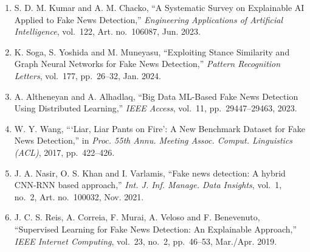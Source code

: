 \documentclass[12pt,a4paper,oneside]{report}
\begin{document}
\begin{enumerate}[label=\arabic*., leftmargin=*, itemsep=6pt]
  \item S. D. M. Kumar and A. M. Chacko,
        ``A Systematic Survey on Explainable AI Applied to Fake News Detection,''
        \textit{Engineering Applications of Artificial Intelligence},
        vol.~122, Art. no.~106087, Jun. 2023.

  \item K. Soga, S. Yoshida and M. Muneyasu,
        ``Exploiting Stance Similarity and Graph Neural Networks for Fake News
        Detection,'' \textit{Pattern Recognition Letters}, vol.~177,
        pp.~26--32, Jan. 2024.

  \item A. Altheneyan and A. Alhadlaq,
        ``Big Data ML-Based Fake News Detection Using Distributed Learning,''
        \textit{IEEE Access}, vol.~11, pp.~29447--29463, 2023.

  \item W. Y. Wang,
        ```Liar, Liar Pants on Fire': A New Benchmark Dataset for Fake News
        Detection,'' in \textit{Proc. 55th Annu. Meeting Assoc. Comput.
        Linguistics (ACL)}, 2017, pp.~422--426.

  \item J. A. Nasir, O. S. Khan and I. Varlamis,
        ``Fake news detection: A hybrid CNN-RNN based approach,''
        \textit{Int. J. Inf. Manage. Data Insights}, vol.~1, no.~2,
        Art. no.~100032, Nov. 2021.

  \item J. C. S. Reis, A. Correia, F. Murai, A. Veloso and F. Benevenuto,
        ``Supervised Learning for Fake News Detection: An Explainable Approach,''
        \textit{IEEE Internet Computing}, vol.~23, no.~2, pp.~46--53,
        Mar./Apr. 2019.

\end{enumerate}
\end{document}
